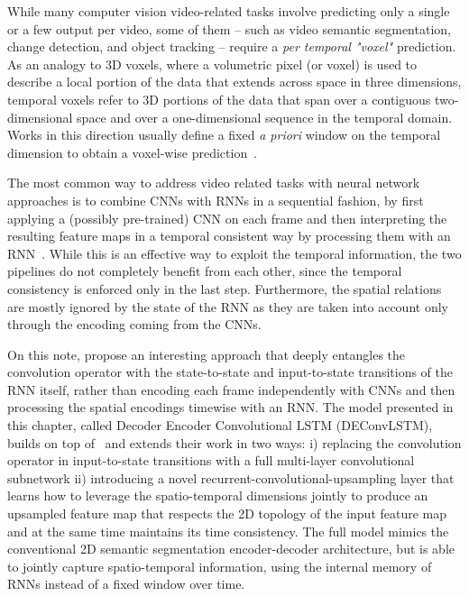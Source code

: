 While many computer vision video-related tasks involve predicting only a single
or a few output per video, some of them -- such as video semantic
segmentation, change detection, and object tracking -- require a
\emph{per temporal "voxel"} prediction. As an analogy to 3D voxels, where a
volumetric pixel (or voxel) is used to describe a local portion of the data
that extends across space in three dimensions, temporal voxels refer to 3D
portions of the data that span over a contiguous two-dimensional space and over
a one-dimensional sequence in the temporal domain.
Works in this direction usually define a fixed \emph{a priori} window on the
temporal dimension to obtain a voxel-wise prediction~\citep{Tran16v2v}.

The most common way to address video related tasks with neural network
approaches is to combine CNNs with RNNs in a sequential fashion, by first
applying a (possibly pre-trained) CNN on each frame and then interpreting the
resulting feature maps in a temporal consistent way by processing them with an
RNN~\citep{Donahue-et-al-arxiv2014,Vinyals-et-al-CVPR2015,Karpathy+Li-CVPR2015,
Venugopalan_2015_ICCV}. While this is an effective way to exploit the temporal
information, the two pipelines do not completely benefit from each other, since
the temporal consistency is enforced only in the last step. Furthermore, the
spatial relations are mostly ignored by the state of the RNN as they are taken
into account only through the encoding coming from the CNNs.

On this note, \cite{ShiCWYWW15} propose an interesting approach that deeply
entangles the convolution operator with the state-to-state and input-to-state
transitions of the RNN itself, rather than encoding each frame independently
with CNNs and then processing the spatial encodings timewise with an RNN. The
model presented in this chapter, called Decoder Encoder Convolutional LSTM
(DEConvLSTM), builds on top of~\cite{ShiCWYWW15} and extends their work in two
ways: i) replacing the convolution operator in input-to-state transitions with
a full multi-layer convolutional subnetwork ii) introducing a novel
recurrent-convolutional-upsampling layer that learns how to leverage the
spatio-temporal dimensions jointly to produce an upsampled feature map that
respects the 2D topology of the input feature map and at the same time
maintains its time consistency. The full model mimics the conventional 2D
semantic segmentation encoder-decoder architecture, but is able to jointly
capture spatio-temporal information, using the internal memory of RNNs instead
of a fixed window over time.

